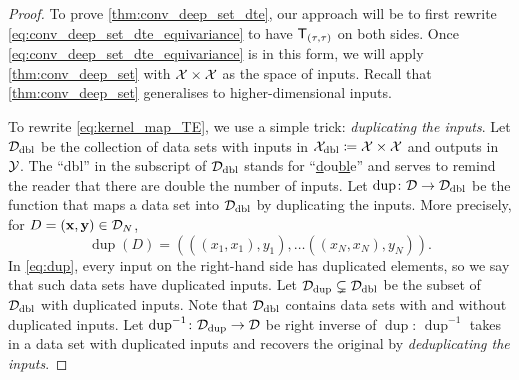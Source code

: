 \documentclass[12pt, twoside]{report}
\begin{document}
\begin{proof}


To prove \cref{thm:conv_deep_set_dte}, our approach will be to first rewrite \eqref{eq:conv_deep_set_dte_equivariance} to have $\T_{(\tau, \tau)}$ on both sides.
Once \eqref{eq:conv_deep_set_dte_equivariance} is in this form, we will apply \cref{thm:conv_deep_set} with $\mathcal{X}\times\mathcal{X}$ as the space of inputs.
Recall that \cref{thm:conv_deep_set} generalises to higher-dimensional inputs.

\newcommand{\dup}{\operatorname{dup}{}\!}%
\newcommand{\dedup}{\operatorname{dup}^{-1}\!{}}%
To rewrite \eqref{eq:kernel_map_TE}, we use a simple trick: \emph{duplicating the inputs}.
Let $\D\ss{dbl}$ be the collection of data sets with inputs in $\X\ss{dbl} \coloneqq \X \times \X$ and outputs in $\mathcal{Y}$.
The ``dbl'' in the subscript of $\D\ss{dbl}$ stands for ``\underline{d}ou\underline{bl}e'' and serves to remind the reader that there are double the number of inputs.
Let $\operatorname{dup}\colon \D \to \D\ss{dbl}$ be the function that maps a data set into $\D\ss{dbl}$ by duplicating the inputs.
More precisely, for $D = (\mathbf{x},\mathbf{y}) \in \mathcal{D}_N$,%
\begin{equation} \label{eq:dup}
    \operatorname{dup}(D) = (
        ((x_1, x_1), y_1),
        \ldots
        ((x_N, x_N), y_N)
    ).
\end{equation}
In \eqref{eq:dup}, every input on the right-hand side has duplicated elements,
so we say that such data sets have duplicated inputs.
Let $\D\ss{dup} \subsetneq \D\ss{dbl}$ be the subset of $\D\ss{dbl}$ with duplicated inputs.
Note that $\D\ss{dbl}$ contains data sets with and without duplicated inputs.
Let $\operatorname{dup}^{-1}\colon \D\ss{dup} \to \D$ be right inverse of $\operatorname{dup}$:
$\operatorname{dup}^{-1}$ takes in a data set with duplicated inputs and recovers the original by \emph{deduplicating the inputs}.


\end{proof}
\end{document}
